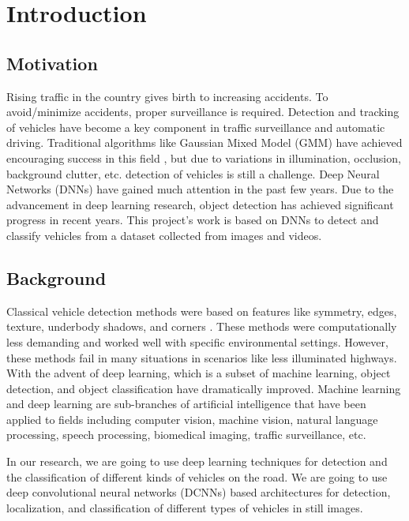 \chapter{Introduction}
\label{1}
\section{Motivation}

Rising traffic in the country gives birth to increasing accidents. To avoid/minimize accidents, proper surveillance is required. Detection and tracking of vehicles have become a key component in traffic surveillance and automatic driving. Traditional algorithms like Gaussian 
Mixed Model (GMM) have achieved encouraging success in this field \cite{chap_1_article:1}, but due to variations in illumination, occlusion, background clutter, etc. detection of vehicles is still a challenge. 
Deep Neural Networks (DNNs) have gained much attention in the past few years. Due to the advancement in deep learning research, object detection has achieved significant progress in recent years. This project's work is based on DNNs to detect and classify vehicles from a dataset collected from images and videos.

\section{Background}

Classical vehicle detection methods were based on features like symmetry, edges, texture, underbody shadows, and corners \cite{chap_1_article:2}. These methods were computationally less demanding and
worked well with specific environmental settings. However, these methods fail in many situations in scenarios like less illuminated highways. With the advent of deep learning, which is a subset of machine learning, object detection, and object classification have dramatically improved. Machine learning and deep learning are sub-branches of artificial intelligence that have been applied to fields including computer vision, machine vision,
natural language processing, speech processing, biomedical imaging,
traffic surveillance, etc. 

In our research, we are going to use deep learning techniques for detection
and the classification of different kinds of vehicles on the road.
We are going to use deep convolutional neural networks (DCNNs)
based architectures for detection, localization, and classification of
different types of vehicles in still images.  

